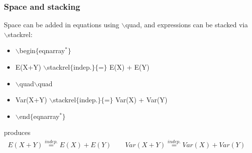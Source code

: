 \begin{frame} \frametitle{Space and stacking}
Space can be added in equations using {\color{command}$\backslash$quad}, and expressions can be stacked via {\color{command}$\backslash$stackrel}:

\vspace{1mm}

\begin{itemize}
\item[] {\color{command}$\backslash$begin}{\color{braces}$\{${\color{black}eqnarray$^*$}$\}$}
\item[] \hspace{2mm} E(X+Y)
	{\color{command}$\backslash$stackrel\color{braces}$\{${\color{black}indep.}$\}\{${\color{black}=}$\}$}
	E(X) + E(Y)
\item[] \hspace{5mm} {\color{command}$\backslash$quad$\backslash$quad}
\item[] \hspace{5mm} Var(X+Y)
	{\color{command}$\backslash$stackrel\color{braces}$\{${\color{black}indep.}$\}\{${\color{black}=}$\}$}
	Var(X) + Var(Y)
\item[] {\color{command}$\backslash$end}{\color{braces}$\{${\color{black}eqnarray$^*$}$\}$}
\end{itemize}

\vspace{1mm}

produces
\begin{eqnarray*}
E(X+Y) \stackrel{indep.}{=} E(X) + E(Y) \quad\quad Var(X+Y) \stackrel{indep.}{=} Var(X) + Var(Y)
\end{eqnarray*}
\end{frame}

